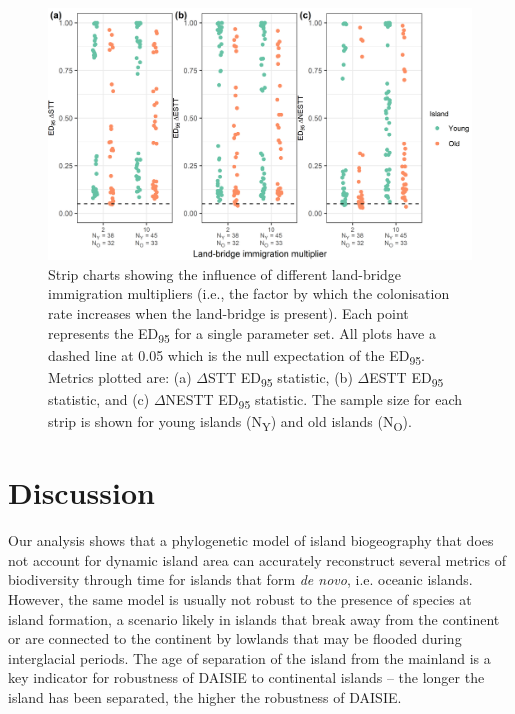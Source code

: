 \documentclass{article}
\begin{document}
\begin{figure}
    \centering
    \includegraphics[width=\textwidth]{nonoceanic_lb_immigration multiplier_spec_nltt.png}
    \caption{Strip charts showing the influence of different land-bridge immigration multipliers (i.e., the factor by which the colonisation rate increases when the land-bridge is present). Each point represents the ED\textsubscript{95} for a single parameter set. All plots have a dashed line at 0.05 which is the null expectation of the ED\textsubscript{95}. Metrics plotted are: (a) $\Delta$STT ED\textsubscript{95} statistic, (b) $\Delta$ESTT ED\textsubscript{95} statistic, and (c) $\Delta$NESTT ED\textsubscript{95} statistic. The sample size for each strip is shown for young islands (N\textsubscript{Y}) and old islands (N\textsubscript{O}).}
    \label{fig:nonoceanic_lb_immigration multiplier_spec_nltt}
\end{figure}

\clearpage

\section*{Discussion}

Our analysis shows that a phylogenetic model of island biogeography that does not account for dynamic island area can accurately reconstruct several metrics of biodiversity through time for islands that form \textit{de novo}, i.e. oceanic islands. However, the same model is usually not robust to the presence of species at island formation, a scenario likely in islands that break away from the continent or are connected to the continent by lowlands that may be flooded during interglacial periods. The age of separation of the island from the mainland is a key indicator for robustness of DAISIE to continental islands – the longer the island has been separated, the higher the robustness of DAISIE. \\
\end{document}
